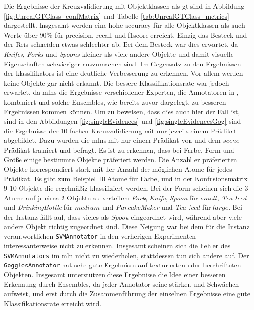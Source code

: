 Die Ergebnisse der Kreuzvalidierung mit Objektklassen als \gls{gt} sind in Abbildung \ref{fig:UnrealGTClass_confMatrix} und Tabelle \ref{tab:UnrealGTClass_metrics} dargestellt. Insgesamt werden eine hohe \gls{accuracy} für alle Objektklassen als auch Werte über 90\% für \gls{precision}, \gls{recall} und \gls{f1score} erreicht. Einzig das Besteck und der Reis schneiden etwas schlechter ab. Bei dem Besteck war dies erwartet, da \textit{Knifes}, \textit{Forks} und \textit{Spoons} kleiner  als viele andere Objekte und damit visuelle Eigenschaften schwieriger auszumachen sind. Im Gegensatz zu den Ergebnissen der \glspl{klassifikator} ist eine deutliche Verbesserung zu erkennen. Vor allem werden keine Objekte gar nicht erkannt. Die bessere Klassifikationsrate war jedoch erwartet, da \glspl{mln} die Ergebnisse verschiedener Experten, die Annotatoren in \robosherlock, kombiniert und solche Ensembles, wie bereits zuvor dargelegt, zu besseren Ergebnissen kommen können. \newline
Um zu beweisen, dass dies auch hier der Fall ist, sind in den Abbildungen \ref{fig:singleEvidences} und \ref{fig:singleEvidencesGog} sind die Ergebnisse der 10-fachen Kreuzvalidierung mit nur jeweils einem Prädikat abgebildet. Dazu wurden die \glspl{mln} mit nur einem Prädikat von \robosherlock und dem $scene$-Prädikat trainiert und befragt. \newline
Es ist zu erkennen, dass bei Farbe, Form und Größe einige bestimmte Objekte präferiert werden. Die Anzahl er präferierten Objekte korrespondiert stark mit der Anzahl der möglichen Atome für jedes Prädikat. Es gibt zum Beispiel 10 Atome für Farbe, und in der Konfusionsmatrix 9-10 Objekte die regelmäßig klassifiziert werden. Bei der Form scheinen sich die 3 Atome auf je circa 2 Objekte zu verteilen: \textit{Fork}, \textit{Knife}, \textit{Spoon} für $small$, \textit{Tea-Iced} und \textit{DrinkingBottle} für $medium$ und \textit{PancakeMaker} und \textit{Tea-Iced} für $large$. Bei der Instanz fällt auf, dass vieles als \textit{Spoon} eingeordnet wird, während aber viele andere Objekt richtig zugeordnet sind. Diese Neigung war bei dem für die Instanz verantwortlichen \texttt{SVMAnnotator} in den vorherigen Experimenten interessanterweise nicht zu erkennen. Insgesamt scheinen sich die Fehler des \texttt{SVMAnnotators} im \gls{mln} nicht zu wiederholen, stattdessen tun sich andere auf. Der \texttt{GogglesAnnotator} hat sehr gute Ergebnisse auf texturierten oder beschrifteten Objekten. Insgesamt unterstützen diese Ergebnisse die Idee einer besseren Erkennung durch Ensembles, da jeder Annotator seine stärken und Schwächen aufweist, und erst durch die Zusammenführung der einzelnen Ergebnisse eine gute Klassifikationsrate erreicht wird.

